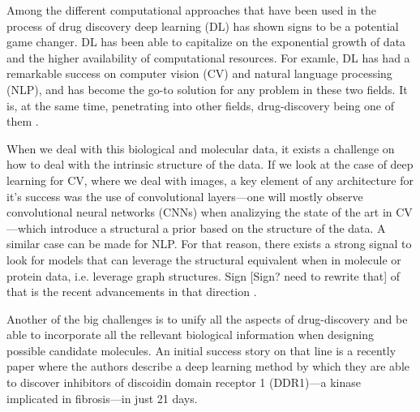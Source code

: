 \documentclass{article}
\begin{document}


Among the different computational approaches that have been used in the process of drug
 discovery deep learning (DL) has shown signs to be a potential game changer. DL has
 been able to capitalize on the exponential growth of data and the higher availability
 of computational resources. For examle, DL has had a remarkable success on computer
 vision (CV) and natural language processing (NLP), and has become the go-to solution
 for any problem in these two fields. It is, at the same time, penetrating into other
 fields, drug-discovery being one of them \cite{Chen2018}. 

When we deal with this biological and molecular data, it exists a challenge on how to
 deal with the intrinsic structure of the data.
 If we look at the case of deep learning for CV, where we deal with images, a key
 element of any architecture for it's success was the use of convolutional layers---one
 will mostly observe convolutional neural networks (CNNs) when analizying the state of
 the art in CV---which introduce a structural a prior based on the structure of the
 data. A similar case can be made for NLP. For that reason, there exists a strong signal
 to look for models that can leverage the structural equivalent when in molecule or
 protein data, i.e. leverage graph structures. Sign [Sign? need to rewrite that] of that
 is the recent advancements in that direction \cite{Sun2019}.
 

Another of the big challenges is to unify all the aspects of drug-discovery and be able
 to incorporate all the rellevant biological information when designing possible
 candidate molecules. An initial success story on that line is a recently paper
 \cite{Zhavoronkov2019} where the authors describe a deep learning method by which they
 are able to discover inhibitors of discoidin domain receptor 1 (DDR1)—a kinase
 implicated in fibrosis—in just 21 days.
\end{document}
